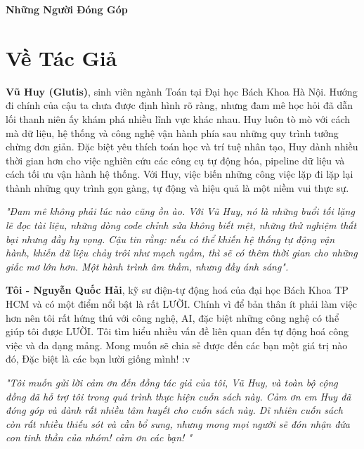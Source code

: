 \documentclass[a4paper,12pt,oneside]{book}
\begin{document}
\newpage
\begin{flushright}
\huge \textbf{Những Người Đóng Góp}
\end{flushright}

\section*{Về Tác Giả}

\textbf{Vũ Huy (Glutis)}, sinh viên ngành Toán tại Đại học Bách Khoa Hà Nội. Hướng đi chính của cậu ta chưa được định hình rõ ràng, nhưng đam mê học hỏi đã dẫn lối thanh niên ấy khám phá nhiều lĩnh vực khác nhau. Huy luôn tò mò với cách mà dữ liệu, hệ thống và công nghệ vận hành phía sau những quy trình tưởng chừng đơn giản. Đặc biệt yêu thích toán học và trí tuệ nhân tạo, Huy dành nhiều thời gian hơn cho việc nghiên cứu các công cụ tự động hóa, pipeline dữ liệu và cách tối ưu vận hành hệ thống. Với Huy, việc biến những công việc lặp đi lặp lại thành những quy trình gọn gàng, tự động và hiệu quả là một niềm vui thực sự.


\textit{"Đam mê không phải lúc nào cũng ồn ào. Với Vũ Huy, nó là những buổi tối lặng lẽ đọc tài liệu, những dòng code chỉnh sửa không biết mệt, những thử nghiệm thất bại nhưng đầy hy vọng. Cậu tin rằng: nếu có thể khiến hệ thống tự động vận hành, khiến dữ liệu chảy trôi như mạch ngầm, thì sẽ có thêm thời gian cho những giấc mơ lớn hơn. Một hành trình âm thầm, nhưng đầy ánh sáng".}


\vspace{0.5cm}

\textbf{Tôi - Nguyễn Quốc Hải}, kỹ sư điện-tự động hoá của đại học Bách Khoa TP HCM và có một điểm nổi bật là rất LƯỜI. Chính vì để bản thân ít phải làm việc hơn nên tôi rất hứng thú với công nghệ, AI, đặc biệt những công nghệ có thể giúp tôi được LƯỜI. Tôi tìm hiểu nhiều vấn đề liên quan đến tự động hoá công việc và đa dạng mảng. Mong muốn sẽ chia sẻ được đến các bạn một giá trị nào đó, Đặc biệt là các bạn lười giống mình! :v 

\textit{"Tôi muốn gửi lời cảm ơn đến đồng tác giả của tôi, Vũ Huy, và toàn bộ cộng đồng đã hỗ trợ tôi trong quá trình thực hiện cuốn sách này. Cảm ơn em Huy đã đóng góp và dành rất nhiều tâm huyết cho cuốn sách này. Dĩ nhiên cuốn sách còn rất nhiều thiếu sót và cần bổ sung, nhưng mong mọi người sẽ đón nhận đứa con tinh thần của nhóm! cảm ơn các bạn! "}
\end{document}
